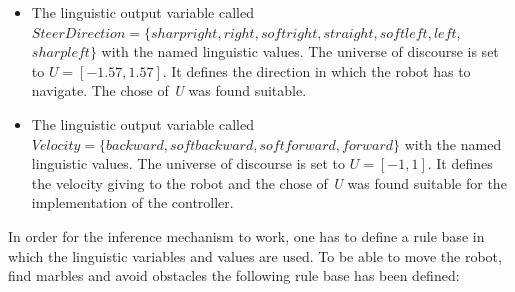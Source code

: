 \documentclass[../Head/Main.tex]{subfiles}
\begin{document}
\begin{itemize}
\item The linguistic output variable called $SteerDirection = \{sharpright, right, softright, straight, softleft, left$, $sharpleft\}$ with the named linguistic values. The universe of discourse is set to ${U} = [-1.57, 1.57]$. It defines the direction in which the robot has to navigate. The chose of \textit{U} was found suitable.
\item The linguistic output variable called $Velocity = \{backward, softbackward, softforward, forward\}$ with the named linguistic values. The universe of discourse is set to ${U} = [-1, 1]$. It defines the velocity giving to the robot and the chose of \textit{U} was found suitable for the implementation of the controller.      
      
\end{itemize}
In order for the inference mechanism to work, one has to define a rule base in which the linguistic variables and values are used. To be able to move the robot, find marbles and avoid obstacles the following rule base has been defined:  
\end{document}
